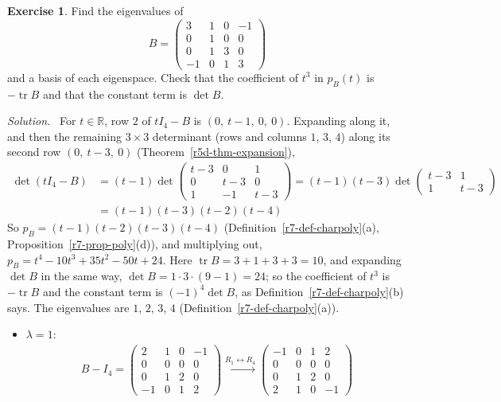 \documentclass[12pt]{article}
\newcommand{\R}{\mathbb R}
\DeclareMathOperator{\tr}{tr}
\theoremstyle{definition}
\newtheorem{exercise}{Exercise}
\newenvironment{solution}{\par\noindent\textit{Solution.}\ }{\par\smallskip}
\begin{document}
\begin{exercise}\label{r7-ex-eigenpairs}
Find the eigenvalues of
\[
B=\begin{pmatrix}3&1&0&-1\\0&1&0&0\\0&1&3&0\\-1&0&1&3\end{pmatrix}
\]
and a basis of each eigenspace. Check that the coefficient of \(t^3\) in \(p_B(t)\) is \(-\tr B\) and that the constant
term is \(\det B\).
\end{exercise}
\begin{solution}
For \(t\in\R\), row \(2\) of \(tI_4-B\) is \((0,\ t-1,\ 0,\ 0)\). Expanding along it, and then the remaining
\(3\times3\) determinant (rows and columns \(1\), \(3\), \(4\)) along its second row \((0,\ t-3,\ 0)\)
(Theorem~\ref{r5d-thm-expansion}),
\[
\begin{aligned}
\det(tI_4-B)&=(t-1)\det\begin{pmatrix}t-3&0&1\\0&t-3&0\\1&-1&t-3\end{pmatrix}
=(t-1)(t-3)\det\begin{pmatrix}t-3&1\\1&t-3\end{pmatrix}\\
&=(t-1)(t-3)(t-2)(t-4)
\end{aligned}
\]
So \(p_B=(t-1)(t-2)(t-3)(t-4)\) (Definition~\ref{r7-def-charpoly}(a), Proposition~\ref{r7-prop-poly}(d)), and
multiplying out, \(p_B=t^4-10t^3+35t^2-50t+24\). Here \(\tr B=3+1+3+3=10\), and expanding \(\det B\) in the same
way, \(\det B=1\cdot3\cdot(9-1)=24\); so the coefficient of \(t^3\) is \(-\tr B\) and the constant term is
\((-1)^4\det B\), as Definition~\ref{r7-def-charpoly}(b) says. The eigenvalues are \(1\), \(2\), \(3\), \(4\)
(Definition~\ref{r7-def-charpoly}(a)).
\begin{itemize}
\item \(\lambda=1\):
\[
\begin{gathered}
B-I_4=\begin{pmatrix}2&1&0&-1\\0&0&0&0\\0&1&2&0\\-1&0&1&2\end{pmatrix}
\xrightarrow{R_1\leftrightarrow R_4}
\begin{pmatrix}-1&0&1&2\\0&0&0&0\\0&1&2&0\\2&1&0&-1\end{pmatrix}

\end{gathered}\]
\end{itemize}
\end{solution}
\end{document}
